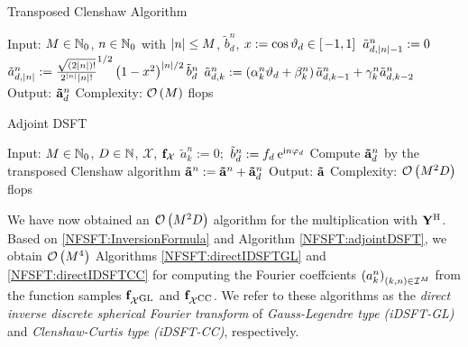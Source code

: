 \begin{algorithm}[tb]
  \caption{Transposed Clenshaw Algorithm}
  \label{NFSFT:transposedClenshaw}    
  \begin{algorithmic}
    \STATE  Input: $M \in \mathbb{N}_{0}$, $n \in \mathbb{N}_{0}$ with $\left\vert n\right\vert \le M$, $\tilde{b}^n_{d}$, $x := \cos\vartheta_{d} \in \left[\left.-1,1\right]\right.$
    \STATE
    \STATE $\tilde{a}_{d,\left\vert n\right\vert-1}^n := 0$
    \STATE $\tilde{a}_{d,\left\vert n\right\vert}^n := \frac{\sqrt{(2|n|)!}}{2^{|n|} |n|!}^{1/2} \left(1-x^2\right)^{|n|/2} \tilde{b}^n_{d}$
      \STATE $\tilde{a}_{d,k}^n := \left(\alpha_{k}^n\vartheta_{d} + \beta_{k}^n\right)\tilde{a}_{d,k-1}^n + \gamma_{k}^n \tilde{a}_{d,k-2}^n$
    \ENDFOR
    \STATE
    \STATE Output: $\mathbf{\tilde{a}}^n_{d}$
    \STATE Complexity: $\mathcal{O}\left(M\right)$ flops
\end{algorithmic}
\end{algorithm}
\begin{algorithm}[tb]
  \caption{Adjoint DSFT}
  \label{NFSFT:adjointDSFT}    
  \begin{algorithmic}
    \STATE  Input: $M \in \mathbb{N}_{0}$, $D \in \mathbb{N}$, $\mathcal{X}$, $\mathbf{f}_{\mathcal{X}}$
    \STATE
        \STATE $\tilde{a}_{k}^n := 0;$
      \ENDFOR
    \ENDFOR
        \STATE $\tilde{b}^n_{d} := f_{d} \: \mbox{\rm{e}}^{\mbox{\scriptsize\rm{i}} n \varphi_{d}}$
        \STATE Compute $\mathbf{\tilde{a}}^n_{d}$ by the transposed Clenshaw algorithm
        \STATE $\mathbf{\tilde{a}}^n := \mathbf{\tilde{a}}^n + \mathbf{\tilde{a}}^n_{d}$
      \ENDFOR
    \ENDFOR
    \STATE
    \STATE Output: $\mathbf{\tilde{a}}$
    \STATE Complexity: $\mathcal{O}\left(M^2 D\right)$ flops
\end{algorithmic}
\end{algorithm}

We have now obtained an $\mathcal{O}\left(M^2 D\right)$ algorithm for the multiplication with $\mathbf{Y}^{\text{\rm{H}}}$. Based on \eqref{NFSFT:InversionFormula} and Algorithm \ref{NFSFT:adjointDSFT}, we obtain $\mathcal{O}\left(M^4\right)$ Algorithms \ref{NFSFT:directIDSFTGL} and \ref{NFSFT:directIDSFTCC} for computing the Fourier coeffcients $\left(a_{k}^n\right)_{(k,n) \in \mathcal{I}^M}$ from the function samples $\mathbf{f}_{\mathcal{X}^{\mbox{\scriptsize\rm{GL}}}}$ and $\mathbf{f}_{\mathcal{X}^{\mbox{\scriptsize\rm{CC}}}}$. We refer to these algorithms as the \emph{direct inverse discrete spherical Fourier transform} of \emph{Gauss-Legendre type (iDSFT-GL)} and \emph{Clenshaw-Curtis type (iDSFT-CC)}, respectively.

